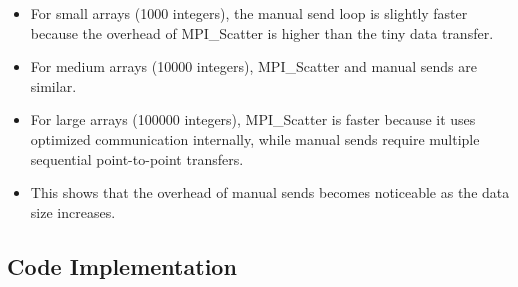 \documentclass[a4paper,12pt]{article}
\begin{document}
\begin{itemize}
    \item For small arrays (1000 integers), the manual send loop is slightly faster because the overhead of MPI\_Scatter is higher than the tiny data transfer.  
    \item For medium arrays (10000 integers), MPI\_Scatter and manual sends are similar.  
    \item For large arrays (100000 integers), MPI\_Scatter is faster because it uses optimized communication internally, while manual sends require multiple sequential point-to-point transfers.  
    \item This shows that the overhead of manual sends becomes noticeable as the data size increases.
\end{itemize}

\subsection{Code Implementation}
\end{document}
